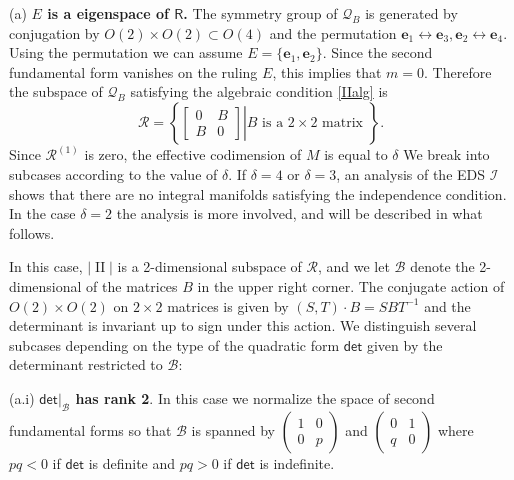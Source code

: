 \documentclass[12pt,reqno]{amsart}
\theoremstyle{definition}
\theoremstyle{remark}
\begin{document}
\medskip
(a) {\bf $E$ is a eigenspace of ${\mathsf R}$.} The symmetry group of ${\mathcal Q}_B$ is generated
by conjugation by $O(2) \times O(2)\subset O(4)$ and the permutation ${\mathbf e}_1 \leftrightarrow {\mathbf e}_3,
{\mathbf e}_2\leftrightarrow {\mathbf e}_4$. Using the permutation we can assume $E=\{{\mathbf e}_1,{\mathbf e}_2\}$.
Since the second fundamental form vanishes on the ruling $E$, this implies that $m=0$.
Therefore the subspace  of ${\mathcal Q}_B$ satisfying the algebraic condition \eqref{IIalg} is
$${\mathcal R} = \left\{\left.
\begin{bmatrix} 0 & B  \\ B & 0 \end{bmatrix}\right| B \text{ is a $2\times 2$ matrix }
\right\}.$$
Since ${\mathcal R}^{(1)}$ is zero, the effective codimension of $M$ is equal to $\delta$
We break into subcases according to the value of $\delta$.
If $\delta =4$ or $\delta=3$, an analysis of the EDS ${{\mathcal I}}$ shows that there
are no integral manifolds satisfying the independence condition.
In the case $\delta=2$ the analysis is more involved, and will be described in what follows.

In this case, $|{\operatorname{II}} |$ is a 2-dimensional subspace of ${\mathcal R}$, and
we let ${\mathcal B}$ denote the 2-dimensional of the matrices $B$ in the upper right corner.
The conjugate action of $O(2)\times O(2)$ on $2\times 2$ matrices is given by $(S,T)\cdot B=SBT^{-1}$
and the determinant is invariant up to sign under this action.
We distinguish several subcases depending
on the type of the quadratic form ${\mathsf{det}}$ given by the determinant restricted to ${\mathcal B}$:

(a.i) {\bf ${\mathsf{det}}|_{\mathcal B}$ has rank 2}.  In this case we normalize the space of second fundamental forms
so that ${\mathcal B}$ is spanned by  $\left(\begin{smallmatrix} 1 & 0 \\ 0& p \end{smallmatrix}\right)$
and $\left(\begin{smallmatrix} 0 & 1 \\ q & 0 \end{smallmatrix}\right)$ where $pq<0$ if ${\mathsf{det}}$ is definite and $pq>0$ if ${\mathsf{det}}$ is indefinite.
\end{document}

